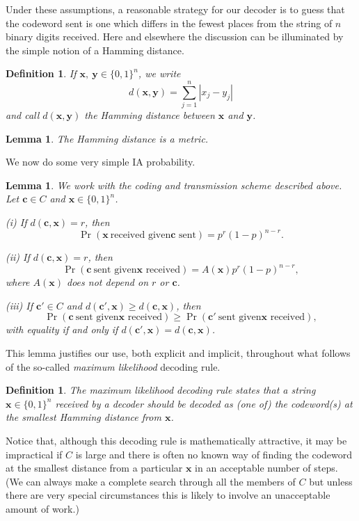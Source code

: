 \documentclass[12pt,a4paper]{article}
\theoremstyle{plain}
\newtheorem{lemma}[theorem]{Lemma}
\newtheorem{definition}[theorem]{Definition}
\theoremstyle{definition}
\begin{document}
Under these
assumptions, a reasonable strategy for our decoder
is to guess
that the codeword sent is one which differs
in the fewest places from the string of $n$
binary digits received. Here and elsewhere
the discussion can be illuminated by the
simple notion of a Hamming distance.
\begin{definition} If $\mathbf{x},\ \mathbf{y}\in \{0,1\}^{n}$,
we write
\[d(\mathbf{x},\mathbf{y})=\sum_{j=1}^{n}|x_{j}-y_{j}|\]
and call $d(\mathbf{x},\mathbf{y})$ the Hamming distance between
$\mathbf{x}$ and $\mathbf{y}$.
\end{definition}
\begin{lemma} The Hamming distance is a metric.
\end{lemma}
We now do some very simple IA probability.
\begin{lemma} We work with the coding and transmission scheme
described above.
Let ${\mathbf c}\in C$ and ${\mathbf x}\in \{0,1\}^{n}$.

(i) If $d({\mathbf c},{\mathbf x})=r$, then
\[\Pr({\mathbf x}\ \text{received given
${\mathbf c}$ sent})=p^{r}(1-p)^{n-r}.\]

(ii)  If
$d({\mathbf c},{\mathbf x})=r$, then
\[\Pr({\mathbf c}\ \text{sent given
${\mathbf x}$ received})=A({\mathbf x})p^{r}(1-p)^{n-r},\]
where $A({\mathbf x})$ does not depend on $r$ or ${\mathbf c}$.

(iii) If ${\mathbf c}'\in C$  and
$d({\mathbf c}',{\mathbf x})\geq d({\mathbf c},{\mathbf x})$,
then
\[\Pr({\mathbf c}\ \text{sent given
${\mathbf x}$ received})\geq
\Pr({\mathbf c}'\ \text{sent given
${\mathbf x}$ received}),\]
with equality if and only if
$d({\mathbf c}',{\mathbf x})=d({\mathbf c},{\mathbf x})$.
\end{lemma}
This lemma justifies our use, both explicit
and implicit, throughout what follows of the so-called
\emph{maximum likelihood} decoding rule.
\begin{definition} The maximum likelihood decoding
rule states that a string ${\mathbf x}\in \{0,1\}^{n}$
received by a decoder should be decoded as
(one of) the codeword(s) at the smallest
Hamming distance from ${\mathbf x}$.
\end{definition}
Notice that, although this decoding rule is mathematically
attractive, it may be impractical if $C$ is large
and there is often no known way of finding the codeword at
the smallest distance from a particular ${\mathbf x}$
in an acceptable number of steps.
(We can always make a complete search through all the
members of $C$ but unless there are very special circumstances
this is likely to involve an unacceptable amount of work.)
\end{document}
